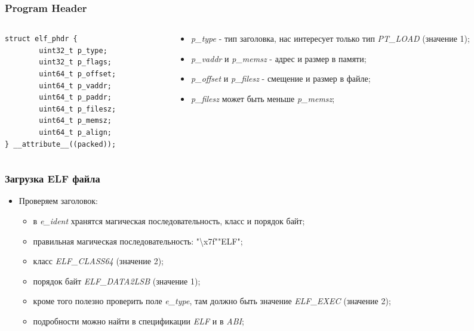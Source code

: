 \begin{frame}[fragile]
\frametitle{Program Header}
\begin{columns}[T]
  \begin{column}{.5\linewidth}
    \begin{lstlisting}
struct elf_phdr {
        uint32_t p_type;
        uint32_t p_flags;
        uint64_t p_offset;
        uint64_t p_vaddr;
        uint64_t p_paddr;
        uint64_t p_filesz;
        uint64_t p_memsz;
        uint64_t p_align;
} __attribute__((packed));
    \end{lstlisting}
  \end{column}
  \begin{column}{.6\linewidth}
    \begin{itemize}
      \item \emph{p\_type} - тип заголовка, нас интересует только тип \emph{PT\_LOAD} (значение 1);
      \item \emph{p\_vaddr} и \emph{p\_memsz} - адрес и размер в памяти;
      \item \emph{p\_offset} и \emph{p\_filesz} - смещение и размер в файле;
      \item \emph{p\_filesz} может быть меньше \emph{p\_memsz};
    \end{itemize}
  \end{column}
\end{columns}
\end{frame}

\begin{frame}
\frametitle{Загрузка ELF файла}
\begin{itemize}
  \item Проверяем заголовок:
    \begin{itemize}
      \item в \emph{e\_ident} хранятся магическая последовательность, класс и порядок байт;
      \item правильная магическая последовательность: "\textbackslash x7f""ELF";
      \item класс \emph{ELF\_CLASS64} (значение 2);
      \item порядок байт \emph{ELF\_DATA2LSB} (значение 1);
      \item кроме того полезно проверить поле \emph{e\_type}, там должно быть значение \emph{ELF\_EXEC} (значение 2);
      \item подробности можно найти в спецификации \emph{ELF} и в \emph{ABI};
    \end{itemize}
\end{itemize}
\end{frame}


